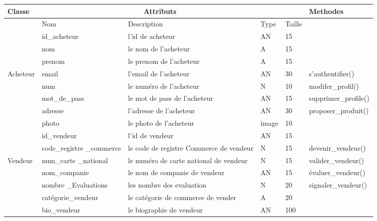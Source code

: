 \documentclass[edit,12pt,a4paper,ChapStyle,oneside,doubleinterligne]{report}
\begin{document}
\begin{table}[H]
    \centering
    \begin{tabular}{ | m{} | m{}| m{3cm} |m{}|m{}|l|}
    \hline
         Classe&\multicolumn{3}{c}{Attributs}&\phantom{h} &Methodes\\
         \hline &Nom&Description&Type&Taille&\\\cline{2-5}
                                        &id\_acheteur&l'id de acheteur&AN&15& \\\cline{2-5}
                                        &nom         &le nom de l'acheteur&A&15& \\\cline{2-5}
                                        &prenom      &le prenom de l'acheteur&A&15& \\\cline{2-6}
                                Acheteur&email       &l'email de l'acheteur&AN&30&s'authentifier() \\\cline{2-6}
                                        &num         &le numéro de l'acheteur&N&10&modifer\_profil() \\\cline{2-6}
                                        &mot\_de\_pass&le mot de pass de l'acheteur&AN&15& supprimer\_profile()\\\cline{2-6}
                                        &adresse     &l'adresse de l'acheteur&AN&30&proposer\_produit()\\\cline{2-6}
                                        &photo       &le photo de l'acheteur&image&10&\\\hline


                                        &id\_vendeur &l'id de vendeur&AN&15& \\\cline{2-6}
                                        &code\_registre \_commerce&le code de registre Commerce de vendeur&N&15&devenir\_vendeur() \\\cline{2-6}
                                Vendeur &num\_carte \_national&le numéro de carte national de vendeur&N&15&valider\_vendeur()\\\cline{2-6}
                                        &nom\_companie &le nom de companie de vendeur&AN&15&évaluer\_vendeur()\\\cline{2-6}
                                        &nombre \_Evaluations&les nombre des evaluation&N&20&signaler\_vendeur()\\\cline{2-6}
                                        &catégorie\_vendeur&le catégorie de commerce de vender&A&20& \\\cline{2-5}
                                        &bio\_vendeur&le biographie de vendeur&AN&100& \\\hline


\end{tabular}
\end{table}
\end{document}

